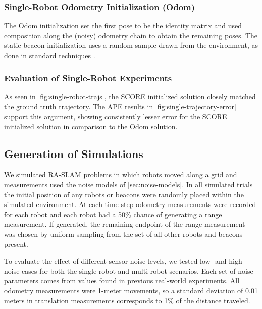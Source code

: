 \SingleRobotGoatsTrajectoryFigure
\SingleRobotGoatAPEBarPlot

\subsubsection{Single-Robot Odometry Initialization (Odom)}
\label{sec:single-robot-odom-init}

The Odom initialization set the first pose to be the identity matrix and used
composition along the (noisy) odometry chain to obtain the remaining poses. The
static beacon initialization uses a random sample drawn from the environment, as
done in standard techniques \cite{Newman03icra,guo2017ijmav}.

\subsubsection{Evaluation of Single-Robot Experiments}

As seen in \cref{fig:single-robot-trajs}, the SCORE initialized solution closely
matched the ground truth trajectory. The APE results in
\cref{fig:single-trajectory-error} support this argument, showing consistently
lesser error for the SCORE initialized solution in comparison to the Odom
solution.

\subsection{Generation of Simulations}
\label{sec:generation-simulated-experiments}


We simulated RA-SLAM problems in which robots moved along a grid and
measurements used the noise models of \cref{sec:noise-models}. In all simulated
trials the initial position of any robots or beacons were randomly placed within
the simulated environment. At each time step odometry measurements were recorded
for each robot and each robot had a 50\% chance of generating a range
measurement. If generated, the remaining endpoint of the range measurement was
chosen by uniform sampling from the set of all other robots and beacons present.

\SingleRobotTrajectoryFigure
\SingleRobotAPEBoxPlot

To evaluate the effect of different sensor noise levels, we tested low- and
high-noise cases for both the single-robot and multi-robot scenarios. Each set
of noise parameters comes from values found in previous real-world experiments.
All odometry measurements were 1-meter movements, so a standard deviation of
0.01 meters in translation measurements corresponds to 1\% of the distance
traveled.

